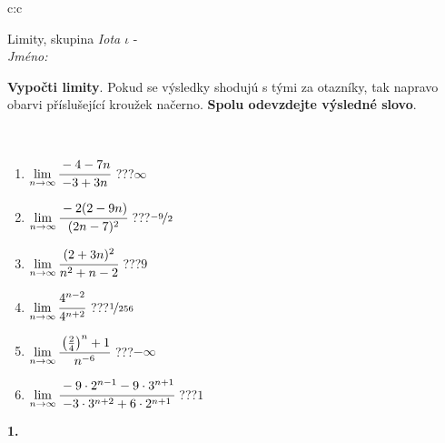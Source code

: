 \documentclass[10pt]{report}
\begin{document}
\begin{tabular}{c:c}
\begin{minipage}[c][104.5mm][t]{0.5\linewidth}
\begin{center}
\vspace{7mm}
{\huge Limity, skupina \textit{Iota $\iota$} -}\\[5mm]
\textit{Jméno:}\phantom{xxxxxxxxxxxxxxxxxxxxxxxxxxxxxxxxxxxxxxxxxxxxxxxxxxxxxxxxxxxxxxxxx}\\[5mm]
\begin{minipage}{0.95\linewidth}
\begin{center}
\textbf{Vypočti limity}. Pokud se výsledky shodujú s tými za otazníky, tak napravo\\obarvi příslušející kroužek načerno. \textbf{Spolu odevzdejte výsledné slovo}.
\end{center}
\end{minipage}
\\[1mm]
\begin{minipage}{0.79\linewidth}
\begin{center}
\begin{varwidth}{\linewidth}
\begin{enumerate}
\normalsize
\item $\lim\limits_{n\to\infty}\cfrac{-4-7n}{-3+3n}$\quad \dotfill\; ???\;\dotfill \quad $\infty$
\item $\lim\limits_{n\to\infty}\cfrac{-2(2-9n)}{(2n-7)^2}$\quad \dotfill\; ???\;\dotfill \quad $\nicefrac{-9}{2}$
\item $\lim\limits_{n\to\infty}\cfrac{(2+3n)^2}{n^2+n-2}$\quad \dotfill\; ???\;\dotfill \quad $9$
\item $\lim\limits_{n\to\infty}\cfrac{4^{n-2}}{4^{n+2}}$\quad \dotfill\; ???\;\dotfill \quad $\nicefrac{1}{256}$
\item $\lim\limits_{n\to\infty}\cfrac{\left(\frac{2}{4}\right)^n +1}{n^{-6}}$\quad \dotfill\; ???\;\dotfill \quad $-\infty$
\item $\lim\limits_{n\to\infty}\cfrac{-9\cdot 2^{n-1}-9\cdot 3^{n+1}}{-3\cdot 3^{n+2}+6\cdot 2^{n+1}}$\quad \dotfill\; ???\;\dotfill \quad $1$
\end{enumerate}
\end{varwidth}
\end{center}
\end{minipage}
\begin{minipage}{0.20\linewidth}
\begin{center}
{\Huge\bfseries 1.} \\[2mm]

\end{center}
\end{minipage}
\end{center}
\end{minipage}
\end{tabular}
\end{document}

